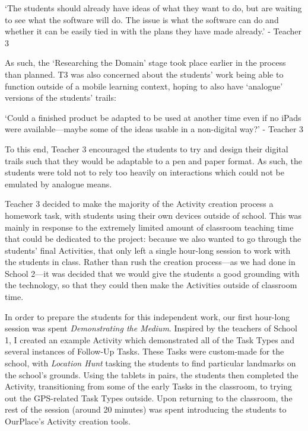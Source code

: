 \begin{displayquote}
`The students should already have ideas of what they want to do, but are waiting to see what the software will do. The issue is what the software can do and whether it can be easily tied in with the plans they have made already.' - Teacher 3
\end{displayquote}

As such, the `Researching the Domain' stage took place earlier in the process than planned. T3 was also concerned about the students' work being able to function outside of a mobile learning context, hoping to also have `analogue' versions of the students' trails: 

\begin{displayquote}
`Could a finished product be adapted to be used at another time even if no iPads were available---maybe some of the ideas usable in a non-digital way?' - Teacher 3
\end{displayquote}

To this end, Teacher 3 encouraged the students to try and design their digital trails such that they would be adaptable to a pen and paper format. As such, the students were told not to rely too heavily on interactions which could not be emulated by analogue means.

Teacher 3 decided to make the majority of the Activity creation process a homework task, with students using their own devices outside of school. This was mainly in response to the extremely limited amount of classroom teaching time that could be dedicated to the project: because we also wanted to go through the students' final Activities, that only left a single hour-long session to work with the students in class. Rather than rush the creation process---as we had done in School 2---it was decided that we would give the students a good grounding with the technology, so that they could then make the Activities outside of classroom time. 

In order to prepare the students for this independent work, our first hour-long session was spent \textit{Demonstrating the Medium}. Inspired by the teachers of School 1, I created an example Activity which demonstrated all of the Task Types and several instances of Follow-Up Tasks. These Tasks were custom-made for the school, with \textit{Location Hunt} tasking the students to find particular landmarks on the school's grounds. Using the tablets in pairs, the students then completed the Activity, transitioning from some of the early Tasks in the classroom, to trying out the GPS-related Task Types outside. Upon returning to the classroom, the rest of the session (around 20 minutes) was spent introducing the students to OurPlace's Activity creation tools.

